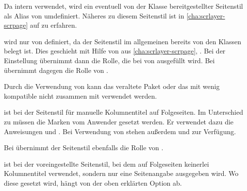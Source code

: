 \begin{description}
  Da  intern
  \hyperref[cha:scrlayer-scrpage]{} verwendet, wird
  ein eventuell von der Klasse bereitgestellter Seitenstil
   als Alias von
   umdefiniert. Näheres zu
  diesem Seitenstil ist in \autoref{cha:scrlayer-scrpage} auf
   zu erfahren.
\item[{\PageStyle{letter}}] %
  wird nur von  definiert, da der
  Seitenstil  im allgemeinen bereits von den Klassen
  belegt ist. Dies geschieht mit Hilfe von
  \hyperref[cha:scrlayer-scrpage]{} aus
  \autoref{cha:scrlayer-scrpage}, . Bei der
  Einstellung %
   übernimmt  dann die Rolle, die bei
   von  ausgefüllt
  wird. Bei %
   übernimmt  dagegen die Rolle von
  .

  Durch die Verwendung von
  \hyperref[cha:scrlayer-scrpage]{} kann das
  veraltete Paket  oder das mit
  \KOMAScript{} wenig kompatible %
   nicht zusammen mit
   verwendet werden.
\item[{\PageStyle{myheadings}}] %
  ist bei  der Seitenstil für
  manuelle Kolumnentitel auf Folgeseiten. Im Unterschied zu 
  müssen die Marken vom Anwender gesetzt werden. Er verwendet dazu die
  Anweisungen  und
  . Bei Verwendung von
  \hyperref[cha:scrlayer-scrpage]{} stehen außerdem
   und
   zur
  Verfügung.

  Bei  übernimmt der
  Seitenstil  ebenfalls die Rolle von
  .
\item[{\PageStyle{plain}}]
  ist bei 
  der voreingestellte Seitenstil, bei dem auf Folgeseiten keinerlei
  Kolumnentitel verwendet, sondern nur eine Seitenangabe ausgegeben wird. Wo
  diese gesetzt wird, hängt von der oben erklärten Option
   ab.


\end{description}

